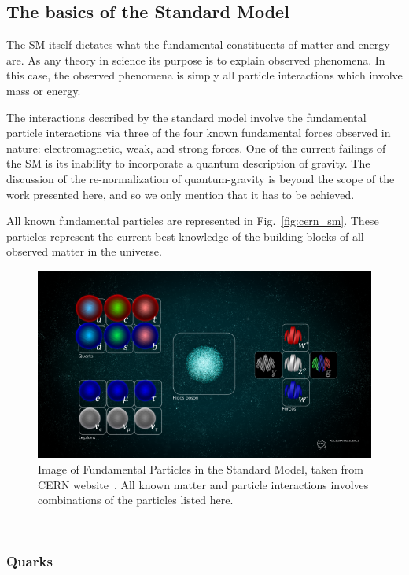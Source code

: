 \subsection{The basics of the Standard Model}

The SM itself dictates what the fundamental constituents of matter and energy are.
As any theory in science its purpose is to explain observed phenomena.
In this case, the observed phenomena is simply all particle interactions which involve mass or energy.

The interactions described by the standard model involve the fundamental particle interactions via three of the four known fundamental forces observed in nature: electromagnetic, weak, and strong forces.
One of the current failings of the SM is its inability to incorporate a quantum description of gravity.
The discussion of the re-normalization of quantum-gravity is beyond the scope of the work presented here, and so we only mention that it has to be achieved.

All known fundamental particles are represented in Fig.~\ref{fig:cern_sm}.
These particles represent the current best knowledge of the building blocks of all observed matter in the universe.

\begin{figure}[]
\centering
\includegraphics[width=\textwidth]{images/STDM_higgs_and_field_D.png}
\caption{Image of Fundamental Particles in the Standard Model, taken from CERN website~\citep{dominguez_2015}. All known matter and particle interactions involves combinations of the particles listed here.}
\end{figure}
~\label{fig:cern_sm}


\subsubsection{Quarks}

